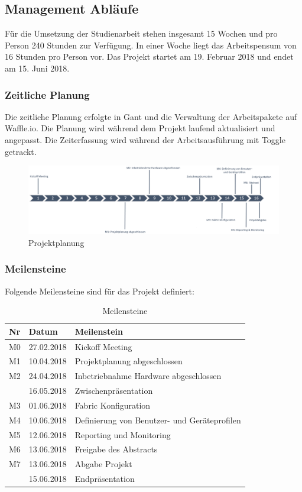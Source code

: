 \subsection{Management Abläufe}
Für die Umsetzung der Studienarbeit stehen insgesamt 15 Wochen und pro Person 240 Stunden zur Verfügung. In einer Woche liegt das Arbeitspensum von 16 Stunden pro Person vor. Das Projekt startet am 19. Februar 2018 und endet am 15. Juni 2018.

\subsubsection{Zeitliche Planung}
Die zeitliche Planung erfolgte in Gant und die Verwaltung der Arbeitspakete auf Waffle.io. Die Planung wird während dem Projekt laufend aktualisiert und angepasst. Die Zeiterfassung wird während der Arbeitsausführung mit Toggle getrackt.

\begin{figure}[H]
	\centering
	\includegraphics[width=16cm]{img/ZeitlichePlanung_v4.png}
	\caption{Projektplanung}
	\label{fig:Projektplanung}
\end{figure} 

\subsubsection{Meilensteine}
Folgende Meilensteine sind für das Projekt definiert:
\begin{table}[H]
	\centering
	\begin{tabularx}{\textwidth}{p{1cm}| p{2.5cm}| X}
		\rowcolor{gray!50}
		\textbf{Nr} & \textbf{Datum} & \textbf{Meilenstein} \\
		\hline	
		M0 & 27.02.2018 & Kickoff Meeting \\
		M1 & 10.04.2018 & Projektplanung abgeschlossen \\
		M2 & 24.04.2018 & Inbetriebnahme Hardware abgeschlossen \\
		& 16.05.2018 & Zwischenpräsentation \\
		M3 & 01.06.2018 & Fabric Konfiguration \\
		M4 & 10.06.2018 & Definierung von Benutzer- und Geräteprofilen \\
		M5 & 12.06.2018 & Reporting und Monitoring \\
		M6 & 13.06.2018 & Freigabe des Abstracts \\
		M7 & 13.06.2018 & Abgabe Projekt \\
		& 15.06.2018 & Endpräsentation \\
	\end{tabularx}
	\caption{Meilensteine}
	\label{tab:Meilensteine}
\end{table}


